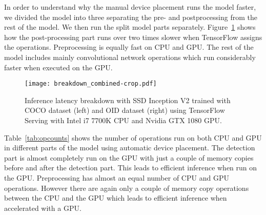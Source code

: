 \documentclass[sigconf]{acmart}
\begin{document}
In order to understand why the manual device placement runs the model faster, we divided the model into three separating the pre- and postprocessing from the rest of the model. We then run the split model parts separately. Figure~\ref{fig:breakdown} shows how the post-processing part runs over two times slower when TensorFlow assigns the operations. Preprocessing is equally fast on CPU and GPU. The rest of the model includes mainly convolutional network operations which run considerably faster when executed on the GPU.

\begin{figure}[t]
\centering
\texttt{[image: breakdown\_combined-crop.pdf]}
\caption{Inference latency breakdown with SSD Inception V2 trained with COCO dataset (left) and OID dataset (right) using TensorFlow Serving with Intel i7 7700K CPU and Nvidia GTX 1080 GPU.}
\label{fig:breakdown}
\end{figure}

Table~\ref{tab:opcounts} shows the number of operations run on both CPU and GPU in different parts of the model using automatic device placement. The detection part is almost completely run on the GPU with just a couple of memory copies before and after the detection part. This leads to efficient inference when run on the GPU. Preprocessing has almost an equal number of CPU and GPU operations. However there are again only a couple of memory copy operations between the CPU and the GPU which leads to efficient inference when accelerated with a GPU.
\end{document}
